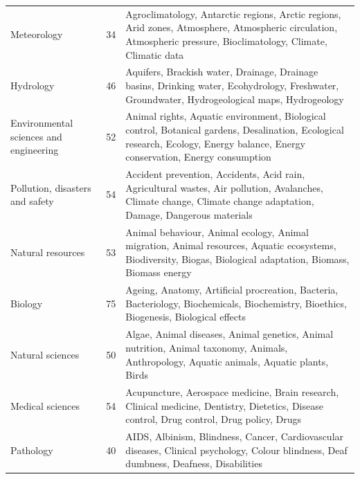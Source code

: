 \documentclass[pdflatex,sn-mathphys-num, iicol]{sn-jnl}
\begin{document}
\begin{table}[t]
\begin{tabular}{@{}p{3.5cm}p{2cm}p{8.5cm}@{}}
		Meteorology & 34 & Agroclimatology, Antarctic regions, Arctic regions, Arid zones, Atmosphere, Atmospheric circulation, Atmospheric pressure, Bioclimatology, Climate, Climatic data \\
		
		Hydrology & 46 & Aquifers, Brackish water, Drainage, Drainage basins, Drinking water, Ecohydrology, Freshwater, Groundwater, Hydrogeological maps, Hydrogeology \\
		
		Environmental sciences and engineering & 52 & Animal rights, Aquatic environment, Biological control, Botanical gardens, Desalination, Ecological research, Ecology, Energy balance, Energy conservation, Energy consumption \\
		
		Pollution, disasters and safety & 54 & Accident prevention, Accidents, Acid rain, Agricultural wastes, Air pollution, Avalanches, Climate change, Climate change adaptation, Damage, Dangerous materials \\
		
		Natural resources & 53 & Animal behaviour, Animal ecology, Animal migration, Animal resources, Aquatic ecosystems, Biodiversity, Biogas, Biological adaptation, Biomass, Biomass energy \\
		
		Biology & 75 & Ageing, Anatomy, Artificial procreation, Bacteria, Bacteriology, Biochemicals, Biochemistry, Bioethics, Biogenesis, Biological effects \\
		
		Natural sciences & 50 & Algae, Animal diseases, Animal genetics, Animal nutrition, Animal taxonomy, Animals, Anthropology, Aquatic animals, Aquatic plants, Birds \\
		
		Medical sciences & 54 & Acupuncture, Aerospace medicine, Brain research, Clinical medicine, Dentistry, Dietetics, Disease control, Drug control, Drug policy, Drugs \\
		
		Pathology & 40 & AIDS, Albinism, Blindness, Cancer, Cardiovascular diseases, Clinical psychology, Colour blindness, Deaf dumbness, Deafness, Disabilities \\
		
		\bottomrule
	\end{tabular}
\end{table}

\normalsize
\end{document}
